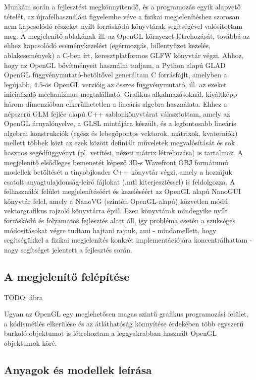 Munkám során a fejlesztést megkönnyítendő, és a programozás egyik alapvető tételét, az újrafelhasználást figyelembe véve a fizikai megjelenítéshez szorosan nem kapcsolódó részeket nyílt forráskódú könyvtárak segítségével valósítottam meg. A megjelenítő ablakának ill. az OpenGL környezet létrehozását, továbbá az ehhez kapcsolódó eseménykezelést (egérmozgás, billentyűzet kezelés, ablakesemények) a C-ben írt, keresztplatformos GLFW könyvtár végzi. Ahhoz, hogy az OpenGL bővítményeit használni tudjam, a Python alapú GLAD OpenGL függvénymutató-betöltővel generáltam C forrásfájlt, amelyben a legújabb, 4.5-ös OpenGL verzióig az összes függvénymutató, ill. az ezeket inicializáló mechanizmus megtalálható. Grafikus alkalmazásoknál, kiváltképp három dimenzióban elkerülhetetlen a lineáris algebra használata. Ehhez a népszerű GLM fejléc alapú C++ sablonkönyvtárat választottam, amely az OpenGL árnyalónyelve, a GLSL mintájára készült, és a legfontosabb lineáris algebrai konstrukciók (egész és lebegőpontos vektorok, mátrixok, kvaterniók) mellett többek közt az ezek között definiált műveletek megvalósítását és sok hasznos segédfüggvényt (pl. vetítési, nézeti mátrix létrehozása) is tartalmaz. A megjelenítő elsődleges bemenetét képező 3D-s Wavefront OBJ formátumú modellek betöltését a tinyobjloader C++ könyvtár végzi, amely a hozzájuk csatolt anyagtulajdonság-leíró fájlokat (.mtl kiterjesztéssel) is feldolgozza. A felhasználói felület megjelenítéséért és kezeléséért az OpenGL alapú NanoGUI könyvtár felel, amely a NanoVG (szintén OpenGL-alapú) közvetlen módú vektorgrafikus rajzoló könyvtárra épül. Ezen könyvtárak mindegyike nyílt forráskódú és folyamatos fejlesztés alatt áll, így probléma esetén a szükséges módosításokat végre tudtam hajtani rajtuk, ami - mindamellett, hogy segítségükkel a fizikai megjelenítés konkrét implementációjára koncentrálhattam - nagy segítséget jelentett a fejlesztés során.

\subsection{A megjelenítő felépítése}

TODO: ábra

Ugyan az OpenGL egy meglehetősen magas szintű grafikus programozási felület, a kódismétlés elkerülése és az átláthatóság könnyítése érdekében több egyszerű burkoló objektumot is létrehoztam a leggyakrabban használt OpenGL objektumok köré.

\subsection{Anyagok és modellek leírása}


